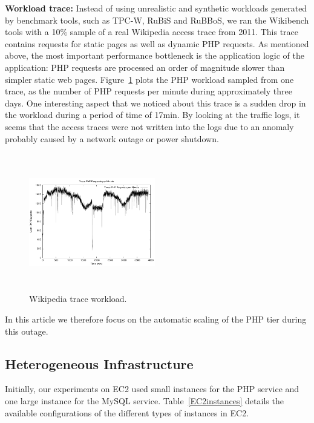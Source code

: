 \textbf{Workload trace:}  Instead of using unrealistic and synthetic workloads generated by benchmark tools, such as TPC-W, RuBiS and RuBBoS, we ran the Wikibench tools with a 10\% sample of a real Wikipedia access trace from 2011.  This trace contains requests for static pages as well as dynamic PHP requests. As mentioned above, the most important performance bottleneck is the application logic of the application: PHP requests are processed an order of magnitude slower than simpler static web pages. Figure~\ref{workload} plots the PHP workload sampled from one trace, as the number of PHP requests per minute during approximately three days. One interesting aspect that we noticed about this trace is a sudden drop in the workload during a period of time of 17min. By looking at the traffic logs, it seems that the access traces were not written into the logs due to an anomaly probably caused by a network outage or power shutdown. 

\begin{figure}
\begin{center}
\includegraphics[width=0.49\textwidth, height=6cm]{./images/traceWorkload2011}
\end{center}
\vspace{-5mm}
\caption{Wikipedia trace workload.}
\label{workload}
\end{figure}

In this article we therefore focus on the automatic scaling of the PHP tier during this outage.

\subsection{Heterogeneous Infrastructure}

Initially, our experiments on EC2 used small instances for the PHP service and one large instance for the MySQL service. Table~\ref{EC2instances} details the available configurations of the different types of instances in EC2.

